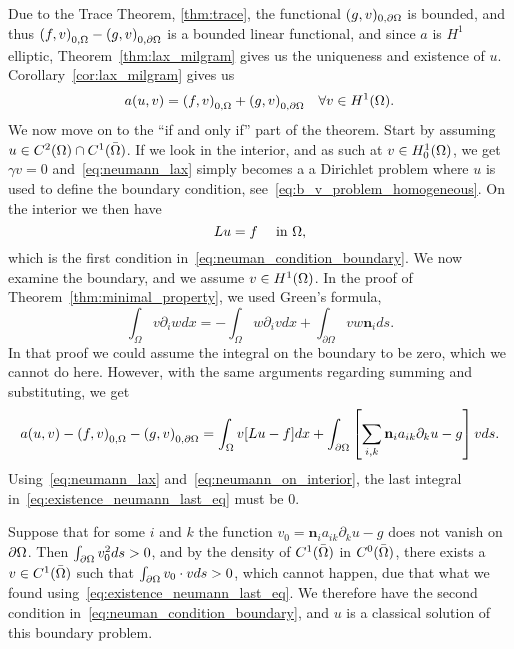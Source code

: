 \begin{bev}
   Due to the Trace Theorem, \ref{thm:trace}, the functional $(g,v)_{0,\partial \Omega}$ is bounded,
   and thus $ {(f,v)}_{0,\Omega} - {(g,v)}_{0,\partial\Omega}$ is a bounded linear functional, 
   and since $a$ is $H^1$ elliptic, Theorem~\ref{thm:lax_milgram} gives us the
   uniqueness and existence of $u$.
   Corollary~\ref{cor:lax_milgram} gives us
   \begin{equation}
      a(u,v) = {(f,v)}_{0,\Omega} + {(g,v)}_{0,\partial\Omega} \quad \forall v \in H^1(\Omega). \label{eq:neumann_lax}
   \end{equation}
   We now move on to the ``if and only if'' part of the theorem. Start by 
   assuming $u \in C^2(\Omega)\cap C^1(\bar{\Omega})$.
   If we look in the interior, and as such at $v \in H^1_0(\Omega)$, we get $\gamma v=0$ 
   and~\eqref{eq:neumann_lax} simply becomes a a Dirichlet problem where 
   $u$ is used to define the boundary condition, see~\eqref{eq:b_v_problem_homogeneous}.
   On the interior we then have 
   \begin{equation}
    Lu = f \quad \text{ in }\Omega, \label{eq:neumann_on_interior}
   \end{equation} 
   which is the first condition in~\eqref{eq:neuman_condition_boundary}.
   We now examine the boundary, and we assume $v\in H^1(\Omega)$.
   In the proof of Theorem~\ref{thm:minimal_property}, we used Green's formula,
    \begin{equation} %
        \int_\Omega v\partial_i w dx = -\int_\Omega w \partial_i v dx + \int_{\partial \Omega} v w \mathbf{n}_i ds.
    \end{equation}
   In that proof we could assume the integral on the boundary to be zero, which 
   we cannot do here. However, with the same arguments regarding summing and substituting, 
   we get
   \begin{equation}
      a(u,v) - {(f,v)}_{0,\Omega} - {(g,v)}_{0,\partial\Omega} = 
      \int_\Omega v[Lu - f] dx + \int_{\partial \Omega}
     \left[ \sum_{i,k}  \mathbf{n}_i a_{ik} \partial_k u-g \right]v ds.
     \label{eq:existence_neumann_last_eq}
   \end{equation}
   Using~\eqref{eq:neumann_lax} and~\eqref{eq:neumann_on_interior},
   the last integral in~\eqref{eq:existence_neumann_last_eq} must be $0$.

   Suppose that for some $i$ and $k$ the function $v_0 = \mathbf{n}_i a_{ik} \partial_k u -g$ does 
   not vanish on $\partial \Omega$. 
   Then $\int_{\partial\Omega}v_0^2ds>0$, and by the density of 
   $C^1(\bar{\Omega})$ in $C^0(\bar{\Omega})$, there exists a $v\in C^1(\bar{\Omega})$
   such that  $\int_{\partial\Omega}v_0\cdot vds>0$, which cannot happen, due that 
   what we found using~\eqref{eq:existence_neumann_last_eq}. 
   We therefore have the second condition in~\eqref{eq:neuman_condition_boundary},
   and $u$ is a classical solution of this boundary problem.


\end{bev}
